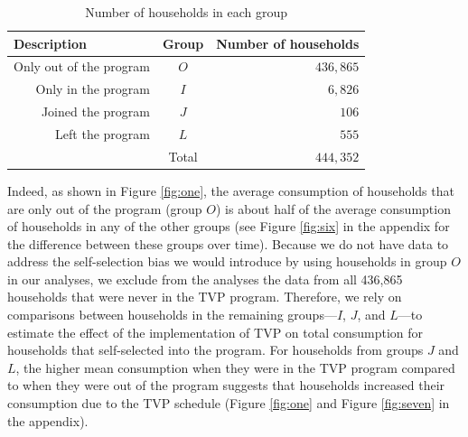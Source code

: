 \documentclass[12pt]{article}
\begin{document}
\begin{table}[]
\centering
\caption{Number of households in each group}
\label{tab:groups}
\begin{tabular}{@{}rcr@{}}
\toprule
\multicolumn{1}{l}{\textbf{Description}} & \multicolumn{1}{l}{\textbf{Group}} & \multicolumn{1}{l}{\textbf{Number of households}} \\ \midrule
Only out of the program & $O$   & $436,865$ \\
Only in the program     & $I$   & $6,826$   \\
Joined the program      & $J$   & $106$     \\
Left the program        & $L$   & $555$     \\ \midrule
                        & Total & $444,352$ \\ \bottomrule
\end{tabular}
\end{table}

Indeed, as shown in Figure \ref{fig:one}, the average consumption of households that are only out of the program (group $O$) is about half of the average consumption of households in any of the other groups (see Figure \ref{fig:six} in the appendix for the difference between these groups over time). Because we do not have data to address the self-selection bias we would introduce by using households in group $O$ in our analyses, we exclude from the analyses the data from all 436,865 households that were never in the TVP program. Therefore, we rely on comparisons between households in the remaining groups---$I$, $J$, and  $L$---to estimate the effect of the implementation of TVP on total consumption for households that self-selected into the program. For households from groups $J$ and $L$, the higher mean consumption when they were in the TVP program compared to when they were out of the program suggests that households increased their consumption due to the TVP schedule (Figure \ref{fig:one} and Figure \ref{fig:seven} in the appendix).
\end{document}
